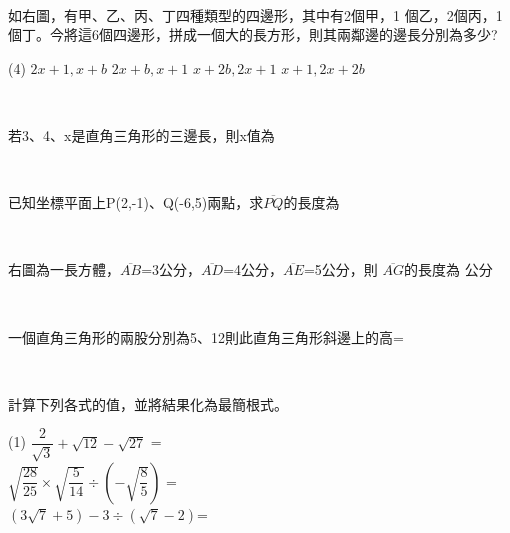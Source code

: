 \documentclass
[answers]
{exam}
\newcommand\ul[1]{\uline{\hspace*{#1}}}
\theoremstyle{definition}
\begin{document}
\begin{questions}
\begin{solution}~\\
	
\end{solution}

\question
如右圖，有甲、乙、丙、丁四種類型的四邊形，其中有2個甲，1 個乙，2個丙，1個丁。今將這6個四邊形，拼成一個大的長方形，則其兩鄰邊的邊長分別為多少?
\begin{tasks}(4)
	\task $2x+1,x+b$
	\task $2x+b,x+1$
	\task $x+2b,2x+1$
	\task $x+1,2x+2b$
\end{tasks}
\begin{solution}~\\
	
\end{solution}

\question
若3、4、x是直角三角形的三邊長，則x值為\ul{50pt}
\begin{solution}~\\
	
\end{solution}

\question
已知坐標平面上P(2,-1)、Q(-6,5)兩點，求$\overline{PQ}$的長度為
\ul{50pt}
\begin{solution}~\\
	
\end{solution}

\question
右圖為一長方體，$\overline{AB}$=3公分，$\overline{AD}$=4公分，$\overline{AE}$=5公分，則 $\overline{AG}$的長度為
\ul{50pt}公分
\begin{solution}~\\
	
\end{solution}

\question
一個直角三角形的兩股分別為5、12則此直角三角形斜邊上的高=
\ul{50pt}
\begin{solution}~\\
	
\end{solution}

\question
計算下列各式的值，並將結果化為最簡根式。
\begin{tasks}(1)
	\task $\dfrac{2}{\sqrt{3}}+\sqrt{12}-\sqrt{27}$ = \ul{50pt}\\
	\task $\sqrt{\dfrac{28}{25}}\times\sqrt{\dfrac{5}{14}}\div\left(-\sqrt{\dfrac{8}{5}}\right)$ = \ul{50pt}\\
	\task $\left(3\sqrt{7}+5\right)-3\div\left(\sqrt{7}-2\right)$= \ul{50pt}\\
\end{tasks}
\begin{solution}~\\
	

\end{solution}
\end{questions}
\end{document}
